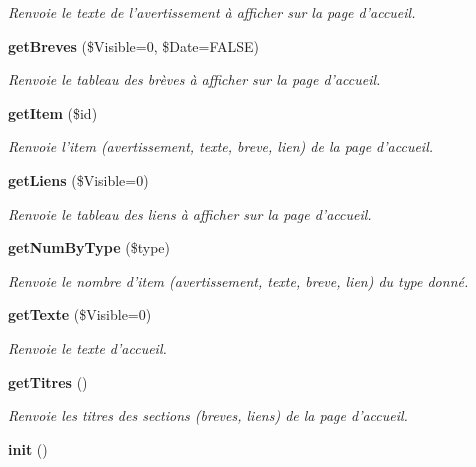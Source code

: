 \begin{CompactItemize}
\begin{CompactList}\small\item\em Renvoie le texte de l'avertissement à afficher sur la page d'accueil. \item\end{CompactList}\item 
{\bf getBreves} (\$Visible=0, \$Date=FALSE)
\begin{CompactList}\small\item\em Renvoie le tableau des brèves à afficher sur la page d'accueil. \item\end{CompactList}\item 
{\bf getItem} (\$id)
\begin{CompactList}\small\item\em Renvoie l'item (avertissement, texte, breve, lien) de la page d'accueil. \item\end{CompactList}\item 
{\bf getLiens} (\$Visible=0)
\begin{CompactList}\small\item\em Renvoie le tableau des liens à afficher sur la page d'accueil. \item\end{CompactList}\item 
{\bf getNumByType} (\$type)
\begin{CompactList}\small\item\em Renvoie le nombre d'item (avertissement, texte, breve, lien) du type donné. \item\end{CompactList}\item 
{\bf getTexte} (\$Visible=0)\label{class_c_accueil_ab120918e85d61cc90f643897bc2ad26}

\begin{CompactList}\small\item\em Renvoie le texte d'accueil. \item\end{CompactList}\item 
{\bf getTitres} ()\label{class_c_accueil_58552c08ab761773f0f8fdb2471d4494}

\begin{CompactList}\small\item\em Renvoie les titres des sections (breves, liens) de la page d'accueil. \item\end{CompactList}\item 
{\bf init} ()\label{class_c_accueil_a1172c89f84eb6e36bb92cdaad61c9bd}


\end{CompactItemize}

